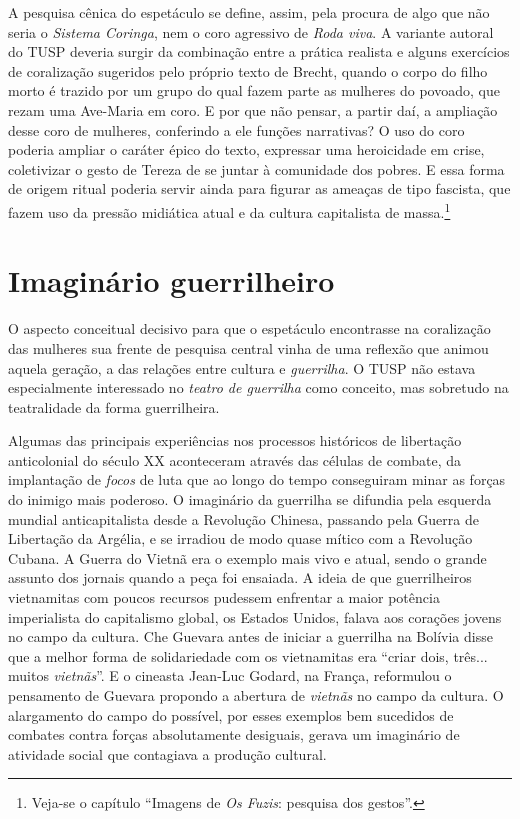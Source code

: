 A pesquisa cênica do espetáculo se define, assim, pela procura de algo
que não seria o \textit{Sistema Coringa}, nem o coro agressivo de \textit{Roda
viva}. A variante autoral do TUSP deveria surgir da combinação entre a
prática realista e alguns exercícios de coralização sugeridos pelo
próprio texto de Brecht, quando o corpo do filho morto é trazido por um
grupo do qual fazem parte as mulheres do povoado, que rezam uma
Ave-Maria em coro. E por que não pensar, a partir daí, a ampliação desse
coro de mulheres, conferindo a ele funções narrativas? O uso do coro
poderia ampliar o caráter épico do texto, expressar uma heroicidade em
crise, coletivizar o gesto de Tereza de se juntar à comunidade dos
pobres. E essa forma de origem ritual poderia servir ainda para figurar
as ameaças de tipo fascista, que fazem uso da pressão midiática atual e
da cultura capitalista de massa.\footnote{Veja-se o capítulo “Imagens de
  \textit{Os Fuzis}: pesquisa dos gestos”.}

\section{Imaginário guerrilheiro}

O aspecto conceitual decisivo para que o espetáculo encontrasse na
coralização das mulheres sua frente de pesquisa central vinha de uma
reflexão que animou aquela geração, a das relações entre cultura e
\textit{guerrilha}. O TUSP não estava especialmente interessado no
\textit{teatro de guerrilha} como conceito, mas sobretudo na teatralidade
da forma guerrilheira.

Algumas das principais experiências nos processos históricos de
libertação anticolonial do século XX aconteceram através das células de
combate, da implantação de \textit{focos} de luta que ao longo do tempo
conseguiram minar as forças do inimigo mais poderoso. O imaginário da
guerrilha se difundia pela esquerda mundial anticapitalista desde a
Revolução Chinesa, passando pela Guerra de Libertação da Argélia, e se
irradiou de modo quase mítico com a Revolução Cubana. A Guerra do Vietnã
era o exemplo mais vivo e atual, sendo o grande assunto dos jornais
quando a peça foi ensaiada. A ideia de que guerrilheiros vietnamitas com
poucos recursos pudessem enfrentar a maior potência imperialista do
capitalismo global, os Estados Unidos, falava aos corações jovens no
campo da cultura. Che Guevara antes de iniciar a guerrilha na Bolívia
disse que a melhor forma de solidariedade com os vietnamitas era “criar
dois, três... muitos \textit{vietnãs}”. E o cineasta Jean-Luc Godard, na
França, reformulou o pensamento de Guevara propondo a abertura de
\textit{vietnãs} no campo da cultura. O alargamento do campo do possível,
por esses exemplos bem sucedidos de combates contra forças absolutamente
desiguais, gerava um imaginário de atividade social que contagiava a
produção cultural.

